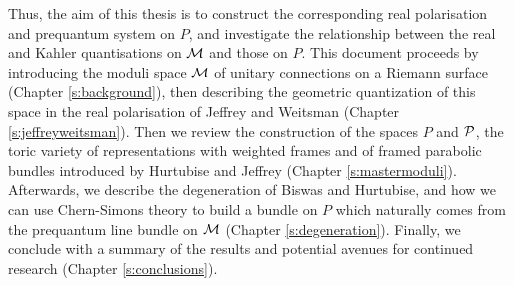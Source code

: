 	Thus, the aim of this thesis is to construct the corresponding real polarisation and prequantum system on $P$, and investigate the relationship between the real and Kahler quantisations on $\mathcal{M}$ and those on $P$. This document proceeds by introducing the moduli space $\mathcal{M}$ of unitary connections on a Riemann surface  (Chapter \ref{s:background}), then describing the geometric quantization of this space in the real polarisation of Jeffrey and Weitsman (Chapter \ref{s:jeffreyweitsman}). Then we review the construction of the spaces $P$ and $\mathcal{P}$, the toric variety of representations with weighted frames and of framed parabolic bundles introduced by Hurtubise and Jeffrey (Chapter \ref{s:mastermoduli}). Afterwards, we describe the degeneration of Biswas and Hurtubise, and how we can use Chern-Simons theory to build a bundle on $P$ which naturally comes from the prequantum line bundle on $\mathcal{M}$ (Chapter \ref{s:degeneration}). Finally, we conclude with a summary of the results and potential avenues for continued research (Chapter \ref{s:conclusions}).

